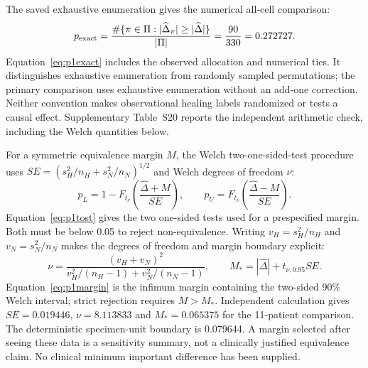 \documentclass[10pt,a4paper]{article}
\begin{document}
The saved exhaustive enumeration gives the numerical all-cell comparison:
\begin{equation}
p_{\rm exact}=\frac{\#\{\pi\in\Pi:|\widehat\Delta_\pi|\geq|\widehat\Delta|\}}{|\Pi|}=\frac{90}{330}=0.272727.\label{eq:p1exact}
\end{equation}
Equation~\eqref{eq:p1exact} includes the observed allocation and numerical ties. It distinguishes exhaustive enumeration from randomly sampled permutations; the primary comparison uses exhaustive enumeration without an add-one correction. Neither convention makes observational healing labels randomized or tests a causal effect. Supplementary Table~S20 reports the independent arithmetic check, including the Welch quantities below.

For a symmetric equivalence margin $M$, the Welch two-one-sided-test procedure uses $SE=(s_H^2/n_H+s_N^2/n_N)^{1/2}$ and Welch degrees of freedom $\nu$:
\begin{equation}
p_L=1-F_{t_\nu}\!\left(\frac{\widehat\Delta+M}{SE}\right),\qquad
p_U=F_{t_\nu}\!\left(\frac{\widehat\Delta-M}{SE}\right).\label{eq:p1tost}
\end{equation}
Equation~\eqref{eq:p1tost} gives the two one-sided tests used for a prespecified margin. Both must be below 0.05 to reject non-equivalence. Writing $v_H=s_H^2/n_H$ and $v_N=s_N^2/n_N$ makes the degrees of freedom and margin boundary explicit:
\begin{equation}
\nu=\frac{(v_H+v_N)^2}{v_H^2/(n_H-1)+v_N^2/(n_N-1)},\qquad
M_*=|\widehat\Delta|+t_{\nu,0.95}SE.\label{eq:p1margin}
\end{equation}
Equation~\eqref{eq:p1margin} is the infimum margin containing the two-sided 90\% Welch interval; strict rejection requires $M>M_*$. Independent calculation gives $SE=0.019446$, $\nu=8.113833$ and $M_*=0.065375$ for the 11-patient comparison. The deterministic specimen-unit boundary is 0.079644. A margin selected after seeing these data is a sensitivity summary, not a clinically justified equivalence claim. No clinical minimum important difference has been supplied.
\end{document}
